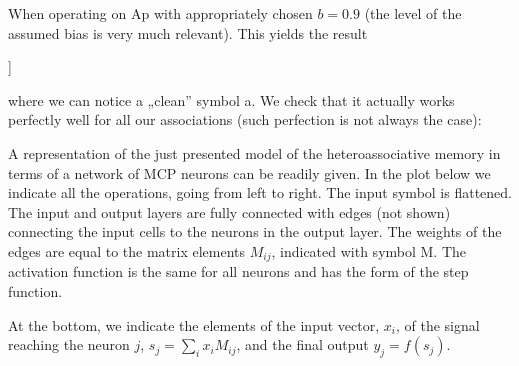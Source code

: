 \documentclass[a4paper,12pt,polish]{jupyterBook}
\begin{document}
\sphinxAtStartPar
When operating on Ap with appropriately chosen \(b=0.9\) (the level of the assumed bias is very much relevant). This yields the result
\begin{sphinxVerbatimInput}

\begin{sphinxVerbatim}[commandchars=\\\{\}]
\end{sphinxVerbatim}
\end{sphinxVerbatimInput}
\begin{sphinxVerbatimOutput}

\begin{sphinxVerbatim}[commandchars=\\\{\}]
[[0 0 0 0 0 0 0 0 0 0 0 0]
 [0 0 0 0 0 0 0 0 0 0 0 0]
 [0 0 0 0 0 0 0 0 0 0 0 0]
 [0 0 0 1 1 1 1 0 0 0 0 0]
 [0 0 1 0 0 0 1 0 0 0 0 0]
 [0 0 1 0 0 0 1 0 0 0 0 0]
 [0 0 1 0 0 0 1 0 0 0 0 0]
 [0 0 0 1 1 1 1 1 0 0 0 0]
 [0 0 0 0 0 0 0 0 0 0 0 0]
 [0 0 0 0 0 0 0 0 0 0 0 0]
 [0 0 0 0 0 0 0 0 0 0 0 0]
 [0 0 0 0 0 0 0 0 0 0 0 0]]
\end{sphinxVerbatim}
\end{sphinxVerbatimOutput}

\sphinxAtStartPar
where we can notice a „clean” symbol a. We check that it actually works perfectly well for all our associations (such perfection is not always the case):
\begin{sphinxVerbatimOutput}

\noindent{}
\end{sphinxVerbatimOutput}

\sphinxAtStartPar
A representation of the just presented model of the heteroassociative memory in terms of a  network of MCP neurons can be readily given. In the plot below we indicate all the operations, going from left to right. The input symbol is flattened. The input and output layers are fully connected with edges (not shown) connecting the input cells to the neurons in the output layer. The weights of the edges are equal to the matrix elements \(M_{ij}\), indicated with symbol M. The activation function is the same for all neurons and has the form of the step function.

\sphinxAtStartPar
At the bottom, we indicate the elements of the input vector, \(x_i\), of the signal reaching the neuron \(j\), \(s_j=\sum_i x_i M_{ij}\), and the final output \(y_j=f(s_j)\).
\begin{sphinxVerbatimOutput}

\noindent{}
\end{sphinxVerbatimOutput}
\end{document}
